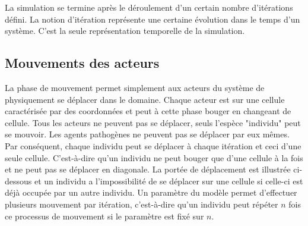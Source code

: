 La simulation se termine après le déroulement d'un certain nombre d'itérations défini. La notion d'itération représente une certaine évolution dans le temps d'un système. C'est la seule représentation temporelle de la simulation.

\subsection{Mouvements des acteurs}

La phase de mouvement permet simplement aux acteurs du système de physiquement se déplacer dans le domaine. Chaque acteur est sur une cellule caractérisée par des coordonnées et peut à cette phase bouger en changeant de cellule. Tous les acteurs ne peuvent pas se déplacer, seuls l'espèce "individu" peut se mouvoir. Les agents pathogènes ne peuvent pas se déplacer par eux mêmes. Par conséquent, chaque individu peut se déplacer à chaque itération et ceci d'une seule cellule. C'est-à-dire qu'un individu ne peut bouger que d'une cellule à la fois et ne peut pas se déplacer en diagonale. La portée de déplacement est illustrée ci-dessous et un individu a l'impossibilité de se déplacer sur une cellule si celle-ci est déjà occupée par un autre individu. Un paramètre du modèle permet d'effectuer plusieurs mouvement par itération, c'est-à-dire qu'un individu peut répéter $n$ fois ce processus de mouvement si le paramètre est fixé sur $n$.\\

